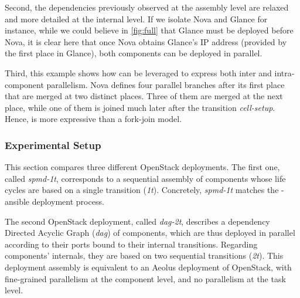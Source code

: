 Second, the dependencies previously observed at the assembly level are relaxed
and more detailed at the internal level. If we isolate Nova and Glance for
instance, while we could believe in \cref{fig:full} that Glance must be deployed
before Nova, it is clear here that once Nova obtains Glance's IP address
(provided by the first place in Glance), both components can be deployed in
parallel.

Third, this example shows how \mad can be leveraged to express both inter and
intra-component parallelism. Nova defines four parallel branches after its first
place that are merged at two distinct places. Three of them are merged at the
next place, while one of them is joined much later after the transition
\emph{cell-setup}. Hence, \mad is more expressive than a fork-join model.

%

\subsubsection{Experimental Setup}

This section compares three different OpenStack deployments. The first one,
called \emph{spmd-1t}, corresponds to a sequential assembly of components whose
life cycles are based on a single transition (\emph{1t}). Concretely,
\emph{spmd-1t} matches the \kolla-ansible deployment process.

The second OpenStack deployment, called \emph{dag-2t}, describes a dependency
Directed Acyclic Graph (\emph{dag}) of components, which are thus deployed in
parallel according to their ports bound to their internal transitions. Regarding
components' internals, they are based on two sequential transitions (\emph{2t}).
This deployment assembly is equivalent to an Aeolus deployment of OpenStack,
with fine-grained parallelism at the component level, and no parallelism at the
task level.

